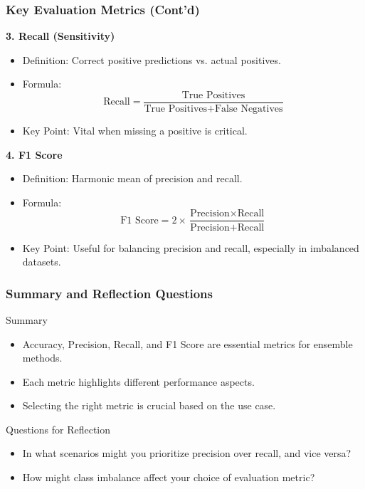 \documentclass[aspectratio=169]{beamer}
\begin{document}
\begin{frame}[fragile]
    \frametitle{Key Evaluation Metrics (Cont'd)}

    \textbf{3. Recall (Sensitivity)}
    \begin{itemize}
        \item Definition: Correct positive predictions vs. actual positives.
        \item Formula: 
        \[
        \text{Recall} = \frac{\text{True Positives}}{\text{True Positives} + \text{False Negatives}}
        \]
        \item Key Point: Vital when missing a positive is critical.
    \end{itemize}

    \textbf{4. F1 Score}
    \begin{itemize}
        \item Definition: Harmonic mean of precision and recall.
        \item Formula: 
        \[
        \text{F1 Score} = 2 \times \frac{\text{Precision} \times \text{Recall}}{\text{Precision} + \text{Recall}}
        \]
        \item Key Point: Useful for balancing precision and recall, especially in imbalanced datasets.
    \end{itemize}
\end{frame}

\begin{frame}[fragile]
    \frametitle{Summary and Reflection Questions}
    \begin{block}{Summary}
        \begin{itemize}
            \item Accuracy, Precision, Recall, and F1 Score are essential metrics for ensemble methods.
            \item Each metric highlights different performance aspects.
            \item Selecting the right metric is crucial based on the use case.
        \end{itemize}
    \end{block}

    \begin{block}{Questions for Reflection}
        \begin{itemize}
            \item In what scenarios might you prioritize precision over recall, and vice versa?
            \item How might class imbalance affect your choice of evaluation metric?
        \end{itemize}
    \end{block}
\end{frame}
\end{document}
